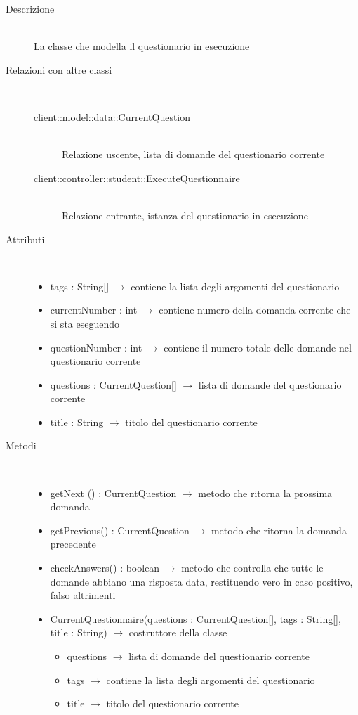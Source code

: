 \begin{description}
\item[Descrizione] \hfill \\
La classe che modella il questionario in esecuzione
\item[Relazioni con altre classi] \hfill \\
\vspace{-7mm}
\begin{description}
	\item[\hyperlink{client::model::data::CurrentQuestion}{client::model::data::CurrentQuestion}] \hfill \\
	Relazione uscente, lista di domande del questionario corrente
	\item[\hyperlink{client::controller::student::ExecuteQuestionnaire}{client::controller::student::ExecuteQuestionnaire}] \hfill \\
	Relazione entrante, istanza del questionario in esecuzione
\end{description}

\item[Attributi] \hfill \\
\vspace{-7mm}
\begin{itemize}
	\item tags : String[] $\rightarrow$ contiene la lista degli argomenti del questionario
	\item currentNumber : int $\rightarrow$ contiene numero della domanda corrente che si sta eseguendo
	\item questionNumber : int $\rightarrow$ contiene il numero totale delle domande nel questionario corrente
	\item questions : CurrentQuestion[] $\rightarrow$ lista di domande del questionario corrente
	\item title : String $\rightarrow$ titolo del questionario corrente
\end{itemize}

\item[Metodi] \hfill \\
\vspace{-7mm}
\begin{itemize}
	\item getNext () : CurrentQuestion $\rightarrow$ metodo che ritorna la prossima domanda
	\item getPrevious() : CurrentQuestion $\rightarrow$ metodo che ritorna la domanda precedente
	\item checkAnswers() : boolean $\rightarrow$ metodo che controlla che tutte le domande abbiano una risposta data, restituendo vero in caso positivo, falso altrimenti
	\item CurrentQuestionnaire(questions : CurrentQuestion[], tags : String[], title : String) $\rightarrow$ costruttore della classe\begin{itemize}
		\item questions $\rightarrow$ lista di domande del questionario corrente
		\item tags $\rightarrow$ contiene la lista degli argomenti del questionario
		\item title $\rightarrow$ titolo del questionario corrente
	\end{itemize}
	

\end{itemize}
\end{description}
